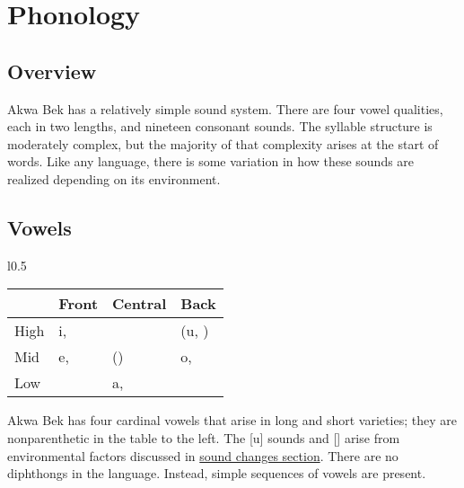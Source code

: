 \documentclass[11pt,letterpaper]{article}
\makeatletter
\newcommand{\tschwa}{\textipa{@}}
\newcommand{\tlonga}{\textipa{a:}}
\newcommand{\tlongi}{\textipa{i:}}
\newcommand{\tlongo}{\textipa{o:}}
\newcommand{\tlonge}{\textipa{e:}}
\newcommand{\tlongu}{\textipa{u:}}
\makeatother
\begin{document}

\section{Phonology}
\label{phonology}
  \subsection{Overview}
  Akwa Bek has a relatively simple sound system. There are four vowel qualities, each in two lengths, and nineteen consonant sounds. The syllable structure is moderately complex, but the majority of that complexity arises at the start of words. Like any language, there is some variation in how these sounds are realized depending on its environment.	

  \subsection{Vowels}
  \label{vowels}
     \begin{wrapfigure}{l}{0.5\textwidth}
       \begin{tabular}{|l|l|l|l|}
         \hline
                 & Front      & Central    & Back         \\ \hline \hline
         High    & i, \tlongi &            & (u, \tlongu) \\
         Mid     & e, \tlonge & (\tschwa)  & o, \tlongo   \\
         Low     &            & a, \tlonga &              \\ \hline
       \end{tabular}
     \end{wrapfigure}
     \par
     Akwa Bek has four cardinal vowels that arise in long and short varieties; they are nonparenthetic in the table to the left. The [u] sounds and [\tschwa] arise from environmental factors discussed in \hyperref[sec:soundalternations]{sound changes section}. There are no diphthongs in the language. Instead, simple sequences of vowels are present.
\end{document}
